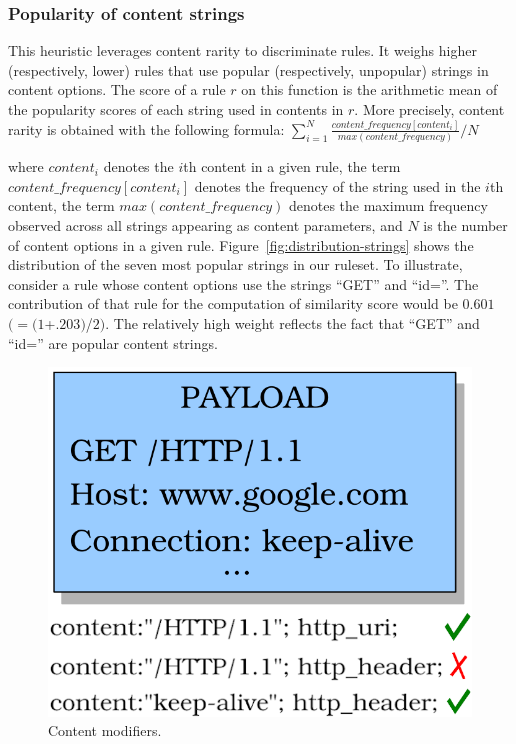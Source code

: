 \documentclass[conference]{IEEEtran}
\begin{document}

\subsubsection{Popularity of content strings} 
This heuristic leverages content rarity to discriminate rules. It
weighs higher (respectively, lower) rules that use popular
(respectively, unpopular) strings in content options. The score of a
rule $r$ on this function is the arithmetic mean of the popularity
scores of each string used in contents in $r$. More precisely, content
rarity is obtained with the following formula:
\indent
$\sum_{i=1}^{N}\frac{\mathit{content\_frequency[content_i]}}{\mathit{max(content\_frequency)}}/N$

\noindent
where $\mathit{content_i}$ denotes the $i$th content in a given
rule, the term $\mathit{content\_frequency[\mathit{content_i}]}$
denotes the frequency of the string used in the $i$th content, the
term $\mathit{max(content\_frequency)}$ denotes the maximum frequency
observed across all strings appearing as content parameters, and $N$
is the number of content options in a given
rule. Figure~\ref{fig:distribution-strings} shows the distribution of
the seven most popular strings in our ruleset. To illustrate, consider a
rule whose content options use the strings ``GET'' and ``id=''. The
contribution of that rule for the computation of similarity score
would be $0.601$ $(=(1$+$.203)$/$2)$. The relatively high weight
reflects the fact that ``GET'' and ``id='' are popular content strings.

\begin{figure}
  \vspace{-2ex}
\centering
\includegraphics[scale=0.6]{figs/http_header-example.png}
\vspace{-1ex}
\caption{Content modifiers.}
\label{fig:http-header-example}
\end{figure}
\end{document}

